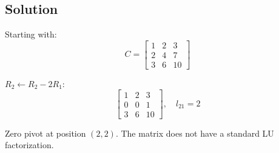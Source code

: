 \subsection*{Solution}

Starting with:
\[
	C = \begin{bmatrix}
		1 & 2 & 3 \\
		2 & 4 & 7 \\
		3 & 6 & 10
	\end{bmatrix}
\]

$R_2 \leftarrow R_2 - 2R_1$:
\[
	\begin{bmatrix}
		1 & 2 & 3 \\
		0 & 0 & 1 \\
		3 & 6 & 10
	\end{bmatrix}, \quad l_{21} = 2
\]

Zero pivot at position $(2,2)$. The matrix does not have a standard LU factorization.